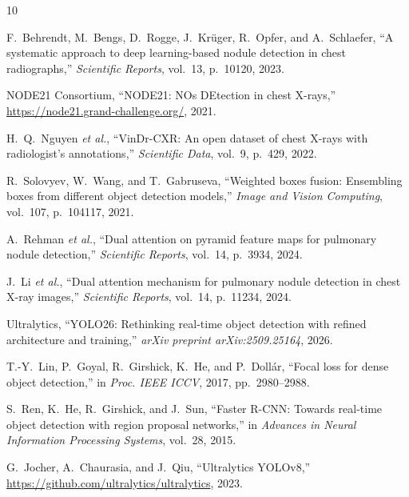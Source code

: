 \documentclass[conference]{IEEEtran}
\begin{document}
\begin{thebibliography}{10}

F.~Behrendt, M.~Bengs, D.~Rogge, J.~Krüger, R.~Opfer, and A.~Schlaefer,
``A systematic approach to deep learning-based nodule detection in chest radiographs,''
\textit{Scientific Reports}, vol.~13, p.~10120, 2023.

NODE21 Consortium,
``NODE21: NOs DEtection in chest X-rays,''
\url{https://node21.grand-challenge.org/}, 2021.

H.~Q.~Nguyen \textit{et al.},
``VinDr-CXR: An open dataset of chest X-rays with radiologist's annotations,''
\textit{Scientific Data}, vol.~9, p.~429, 2022.

R.~Solovyev, W.~Wang, and T.~Gabruseva,
``Weighted boxes fusion: Ensembling boxes from different object detection models,''
\textit{Image and Vision Computing}, vol.~107, p.~104117, 2021.

A.~Rehman \textit{et al.},
``Dual attention on pyramid feature maps for pulmonary nodule detection,''
\textit{Scientific Reports}, vol.~14, p.~3934, 2024.

J.~Li \textit{et al.},
``Dual attention mechanism for pulmonary nodule detection in chest X-ray images,''
\textit{Scientific Reports}, vol.~14, p.~11234, 2024.

Ultralytics,
``YOLO26: Rethinking real-time object detection with refined architecture and training,''
\textit{arXiv preprint arXiv:2509.25164}, 2026.

T.-Y.~Lin, P.~Goyal, R.~Girshick, K.~He, and P.~Dollár,
``Focal loss for dense object detection,''
in \textit{Proc. IEEE ICCV}, 2017, pp.~2980--2988.

S.~Ren, K.~He, R.~Girshick, and J.~Sun,
``Faster R-CNN: Towards real-time object detection with region proposal networks,''
in \textit{Advances in Neural Information Processing Systems}, vol.~28, 2015.

G.~Jocher, A.~Chaurasia, and J.~Qiu,
``Ultralytics YOLOv8,''
\url{https://github.com/ultralytics/ultralytics}, 2023.

\end{thebibliography}
\end{document}
